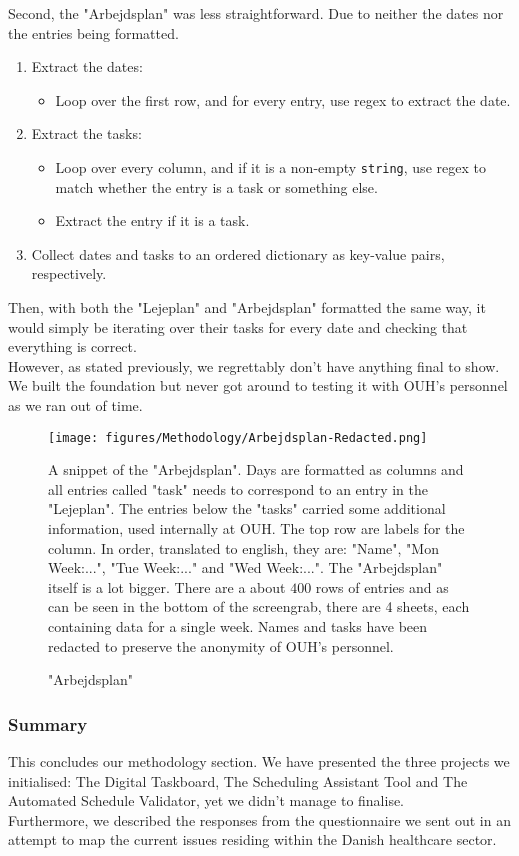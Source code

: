 \newpage
Second, the "Arbejdsplan" was less straightforward. Due to neither the dates nor the entries being formatted. 
\begin{enumerate}
	\item Extract the dates:
		\begin{itemize}
			\item Loop over the first row, and for every entry, use regex to extract the date.	
		\end{itemize}
	\item Extract the tasks:
		\begin{itemize}
			\item Loop over every column, and if it is a non-empty \texttt{string}, use regex to match whether the entry is a task or something else.
			\item Extract the entry if it is a task.	
		\end{itemize}
	\item Collect dates and tasks to an ordered \gls{dictionary} as key-value pairs, respectively.
\end{enumerate}
Then, with both the "Lejeplan" and "Arbejdsplan" formatted the same way, it would simply be iterating over their tasks for every date and checking that everything is correct.
\\
However, as stated previously, we regrettably don't have anything final to show. We built the foundation but never got around to testing it with OUH's personnel as we ran out of time.     
\begin{figure}[H]
    \centering
    \texttt{[image: figures/Methodology/Arbejdsplan-Redacted.png]}
    \caption{"Arbejdsplan"}
    \small
    \raggedright 
    A snippet of the "Arbejdsplan". Days are formatted as columns and all entries called "task" needs to correspond to an entry in the "Lejeplan". The entries below the "tasks" carried some additional information, used internally at OUH. The top row are labels for the column. In order, translated to english, they are: "Name", "Mon Week:...", "Tue Week:..." and "Wed Week:...". The "Arbejdsplan" itself is a lot bigger. There are a about \(400\) rows of entries and as can be seen in the bottom of the screengrab, there are 4 sheets, each containing data for a single week. Names and tasks have been redacted to preserve the anonymity of OUH's personnel.
    \label{fig:Arbejdsplan}
\end{figure}

\subsubsection*{Summary}
This concludes our methodology section. We have presented the three projects we initialised: The Digital Taskboard, The Scheduling Assistant Tool and The Automated Schedule Validator, yet we didn't manage to finalise.
\\
Furthermore, we described the responses from the questionnaire we sent out in an attempt to map the current issues residing within the Danish healthcare sector.
